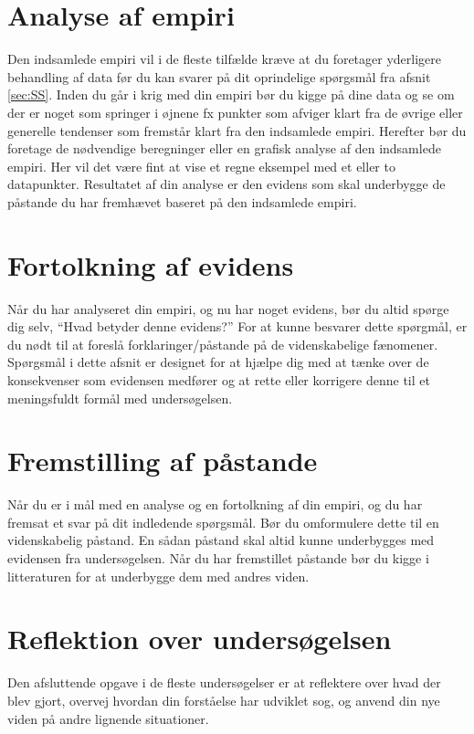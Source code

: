  \section{Analyse af empiri}
 \label{sec:AaE}
 Den indsamlede empiri vil i de fleste tilfælde kræve at du foretager yderligere behandling af data før du kan svarer på dit oprindelige spørgsmål fra afsnit \vref{sec:SS}. Inden du går i krig med din empiri bør du kigge på dine data og se om der er noget som springer i øjnene fx punkter som afviger klart fra de øvrige eller generelle tendenser som fremstår klart fra den indsamlede empiri. Herefter bør du foretage de nødvendige beregninger eller en grafisk analyse af den indsamlede empiri. Her vil det være fint at vise et regne eksempel med et eller to datapunkter. Resultatet af din analyse er den evidens som skal underbygge de påstande du har fremhævet baseret på den indsamlede empiri.
 
 \section{Fortolkning af evidens}
\label{sec:FaE}
Når du har analyseret din empiri, og nu har noget evidens, bør du altid spørge dig selv, ``Hvad betyder denne evidens?'' For at kunne besvarer dette spørgmål, er du nødt til at foreslå forklaringer/påstande på de videnskabelige fænomener. Spørgsmål i dette afsnit er designet for at hjælpe dig med at tænke over de konsekvenser som evidensen medfører og at rette eller korrigere denne til et meningsfuldt formål med undersøgelsen.

\section{Fremstilling af påstande}
\label{sec:FaP}
Når du er i mål med en analyse og en fortolkning af din empiri, og du har fremsat et svar på dit indledende spørgsmål. Bør du omformulere dette til en videnskabelig påstand. En sådan påstand skal altid kunne underbygges med evidensen fra undersøgelsen. Når du har fremstillet påstande bør du kigge i litteraturen for at underbygge dem med andres viden.

\section{Reflektion over undersøgelsen}
\label{sec:RoU}
Den afsluttende opgave i de fleste undersøgelser er at reflektere over hvad der blev gjort, overvej hvordan din forståelse har udviklet sog, og anvend din nye viden på andre lignende situationer.

